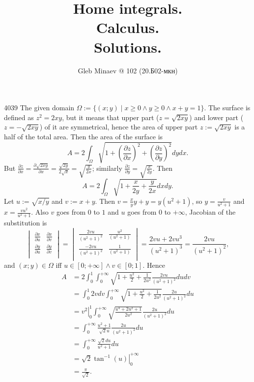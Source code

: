 \documentclass[12pt,a4paper]{article}
\title{Home integrals.\\Calculus.\\Solutions.}
\author{Gleb Minaev @ 102 (20.Б02-мкн)}
\date{}
\begin{document}
    \maketitle

    \begin{problem}{4039}
        The given domain $\Omega := \{(x; y) \mid x \geqslant 0 \wedge y \geqslant 0 \wedge x + y = 1\}$. The surface is defined as $z^2 = 2xy$, but it means that upper part ($z = \sqrt{2xy}$) and lower part ($z = -\sqrt{2xy}$) of it are symmetrical, hence the area of upper part $z := \sqrt{2xy}$ is a half of the total area. Then the area of the surface is
        \[
            A = 2\int_{\Omega} \sqrt{1 + \left(\frac{\partial z}{\partial x}\right)^2 + \left(\frac{\partial z}{\partial y}\right)^2} dy dx.
        \]
        But $\frac{\partial z}{\partial x} = \frac{\partial \sqrt{2xy}}{\partial x} = \frac{\sqrt{2y}}{2\sqrt{x}} = \sqrt{\frac{y}{2x}}$; similarly $\frac{\partial z}{\partial y} = \sqrt{\frac{x}{2y}}$. Then
        \[
            A = 2\int_\Omega \sqrt{1 + \frac{x}{2y} + \frac{y}{2x}} dx dy.
        \]
        Let $u := \sqrt{x/y}$ and $v := x + y$. Then $v = \frac{x}{y} y + y = y (u^2 + 1)$, so $y = \frac{v}{u^2 + 1}$ and $x = \frac{v u^2}{u^2 + 1}$. Also $v$ goes from $0$ to $1$ and $u$ goes from $0$ to $+\infty$, Jacobian of the substitution is
        \[
            \begin{vmatrix}
                \frac{\partial x}{\partial u}& \frac{\partial x}{\partial v}\\
                \frac{\partial y}{\partial u}& \frac{\partial y}{\partial v}\\
            \end{vmatrix}
            =
            \begin{vmatrix}
                \frac{2vu}{(u^2 + 1)^2}& \frac{u^2}{(u^2 + 1)}\\
                \frac{-2vu}{(u^2 + 1)^2}& \frac{1}{(u^2 + 1)}\\
            \end{vmatrix}
            = \frac{2vu + 2vu^3}{(u^2+1)^3}
            = \frac{2vu}{(u^2+1)^2},
        \]
        and $(x; y) \in \Omega$ iff $u \in [0; +\infty] \wedge v \in [0; 1]$. Hence
        \begin{align*}
            A
            &= 2\int_0^1 \int_0^{+\infty} \sqrt{1 + \frac{u^2}{2} + \frac{1}{2u^2}} \frac{2vu}{(u^2+1)^2} du dv\\
            &= \int_0^1 2v dv \int_0^{+\infty} \sqrt{1 + \frac{u^2}{2} + \frac{1}{2u^2}} \frac{2u}{(u^2+1)^2} du\\
            &= \left.v^2\right|_0^1 \int_0^{+\infty} \sqrt{\frac{u^4 + 2u^2 + 1}{2u^2}} \frac{2u}{(u^2+1)^2} du\\
            &= \int_0^{+\infty} \frac{u^2 + 1}{\sqrt{2}u} \frac{2u}{(u^2+1)^2} du\\
            &= \int_0^{+\infty} \frac{\sqrt{2}du}{u^2+1} du\\
            &= \left.\sqrt{2}\tan^{-1}(u)\right|_0^{+\infty}\\
            &= \frac{\pi}{\sqrt{2}}.
        \end{align*}
    \end{problem}
\end{document}
